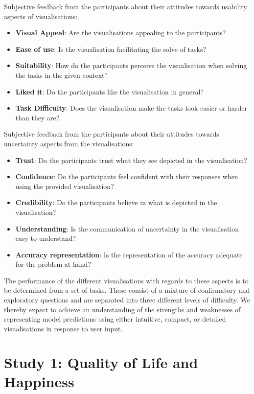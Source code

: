 \documentclass[final,5p,times,twocolumn,authoryear]{elsarticle}
\begin{document}
Subjective feedback from the participants about their attitudes towards usability aspects of visualisations:

\begin{itemize}
  \item \textbf{Visual Appeal}: Are the visualisations appealing to the participants?
  \item \textbf{Ease of use}: Is the visualisation facilitating the solve of tasks?
  \item \textbf{Suitability}: How do the participants perceive the visualisation when solving the tasks in the given context? 
  \item \textbf{Liked it}: Do the participants like the visualisation in general?
  \item \textbf{Task Difficulty}: Does the visualisation make the tasks look easier or harder than they are?
\end{itemize}

Subjective feedback from the participants about their attitudes towards uncertainty aspects from the visualisations:

\begin{itemize}  
  \item \textbf{Trust}: Do the participants trust what they see depicted in the visualisation?
  \item \textbf{Confidence}: Do the participants feel confident with their responses when using the provided visualisation?
  \item \textbf{Credibility}: Do the participants believe in what is depicted in the visualisation?
  \item \textbf{Understanding}: Is the communication of uncertainty in the visualisation easy to understand?
  \item \textbf{Accuracy representation}: Is the representation of the accuracy adequate for the problem at hand?
\end{itemize}

The performance of the different visualisations with regards to these aspects is to be determined from a set of tasks. These consist of a mixture of confirmatory and exploratory questions and are separated into three different levels of difficulty. We thereby expect to achieve an understanding of the strengths and weaknesses of representing model predictions using either intuitive, compact, or detailed visualisations in response to user input. 

\section{Study 1: Quality of Life and Happiness}
\end{document}
